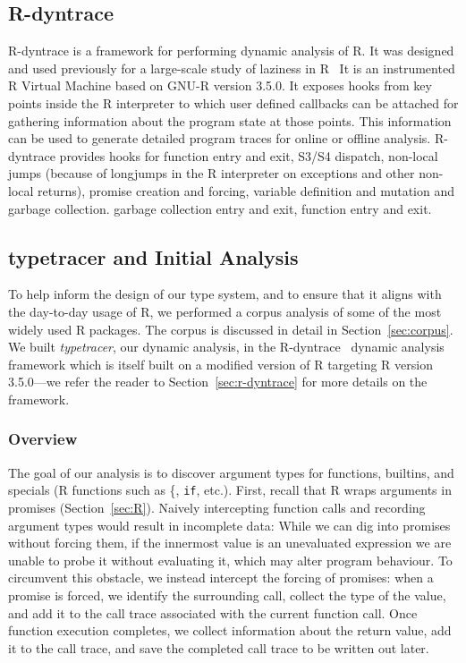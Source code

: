 \documentclass[acmsmall,review,anonymous]{acmart}\settopmatter{printfolios=true,printccs=false,printacmref=false}
\newcommand{\code}[1]{{\lstinline[style=Rin]!#1!}\xspace}
\newcommand{\typetracer}{\emph{typetracer}\xspace} %
\begin{document}
%
\subsection{R-dyntrace}
R-dyntrace is a framework for performing dynamic analysis of R. It was designed
and used previously for a large-scale study of laziness in R~\cite{oopsla19} It
is an instrumented R Virtual Machine based on GNU-R version 3.5.0. It exposes
hooks from key points inside the R interpreter to which user defined callbacks
can be attached for gathering information about the program state at those
points. This information can be used to generate detailed program traces for
online or offline analysis. R-dyntrace provides hooks for function entry and
exit, S3/S4 dispatch, non-local jumps (because of longjumps in the R interpreter
on exceptions and other non-local returns), promise creation and forcing,
variable definition and mutation and garbage collection. garbage collection
entry and exit, function entry and exit.


%
%
\subsection{typetracer and Initial Analysis}

To help inform the design of our type system, and to ensure that it aligns
with the day-to-day usage of R, we performed a corpus analysis of some of
the most widely used R packages.  The corpus is discussed in detail in
Section~\ref{sec:corpus}.  We built \typetracer, our dynamic analysis, in
the R-dyntrace~\cite{oopsla19} dynamic analysis framework which is itself
built on a modified version of R targeting R version 3.5.0---we refer the
reader to Section~\ref{sec:r-dyntrace} for more details on the framework.

%
%
\subsubsection{Overview}
The goal of our analysis is to discover argument types for functions,
builtins, and specials (R functions such as \{, \code{if}, etc.).  First,
recall that R wraps arguments in promises (Section~\ref{sec:R}).  Naively
intercepting function calls and recording argument types would result in
incomplete data: While we can dig into promises without forcing them, if the
innermost value is an unevaluated expression we are unable to probe it
without evaluating it, which may alter program behaviour.  To circumvent
this obstacle, we instead intercept the forcing of promises: when a promise
is forced, we identify the surrounding call, collect the type of the value,
and add it to the call trace associated with the current function call.
Once function execution completes, we collect information about the return
value, add it to the call trace, and save the completed call trace to be
written out later.
%
%
\end{document}
